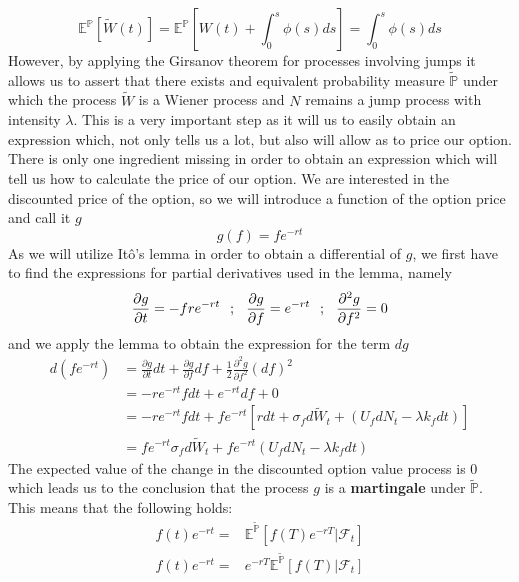\documentclass[times, utf8, diplomski]{fer}
\begin{document}
\begin{equation*}
	\mathbb{E}^{\mathbb{P}}[\tilde{W}(t)] = \mathbb{E}^{\mathbb{P}}[W(t) + \int_0^s \phi(s) ds] = \int_0^s \phi(s) ds
\end{equation*}
However, by applying the Girsanov theorem for processes involving jumps it allows us to assert that there exists and equivalent probability measure $\tilde{\mathbb{P}}$ under which the process $\tilde{W}$ is a Wiener process and $N$ remains a jump process with intensity $\lambda$. This is a very important step as it will us to easily obtain an expression which, not only tells us a lot, but also will allow as to price our option. There is only one ingredient missing in order to obtain an expression which will tell us how to calculate the price of our option. We are interested in the discounted price of the option, so we will introduce a function of the option price and call it $g$ $$ g(f) =  fe^{-rt} $$ As we will utilize It\^{o}'s lemma in order to obtain a differential of $g$, we first have to find the expressions for partial derivatives used in the lemma, namely
$$
	\frac{\partial g}{\partial t} = -fre^{-rt} \hspace{0.25cm} ; \hspace{0.25cm} \frac{\partial g}{\partial f} = e^{-rt} \hspace{0.25cm} ; \hspace{0.25cm} \frac{\partial^2 g}{\partial f^2} = 0
$$
and we apply the lemma to obtain the expression for the term $dg$
\begin{align*}
	d(fe^{-rt}) &= \frac{\partial g}{\partial t}dt + \frac{\partial g}{\partial f}df + \frac{1}{2}\frac{\partial^2 g}{\partial f^2}(df)^2 \\
				&= -re^{-rt}fdt + e^{-rt}df + 0 \\
				&= -re^{-rt}fdt + fe^{-rt}[r dt + \sigma_f d\tilde{W}_t + (U_fdN_t - \lambda k_f dt)] \\
				&= fe^{-rt}\sigma_f d\tilde{W}_t + fe^{-rt}(U_fdN_t-\lambda k_f dt)
\end{align*}
The expected value of the change in the discounted option value process is $0$ which leads us to the conclusion that the process $g$ is a \textbf{martingale} under $\tilde{\mathbb{P}}$. This means that the following holds: 
\begin{equation*}
	\begin{split}
		f(t)e^{-rt} =& \mathbb{E}^{\tilde{\mathbb{P}}}[f(T)e^{-rT}|\mathcal{F}_t]\\
		f(t)e^{-rt} =& e^{-rT}\mathbb{E}^{\tilde{\mathbb{P}}}[f(T)|\mathcal{F}_t]
	\end{split}	
\end{equation*}
\end{document}

